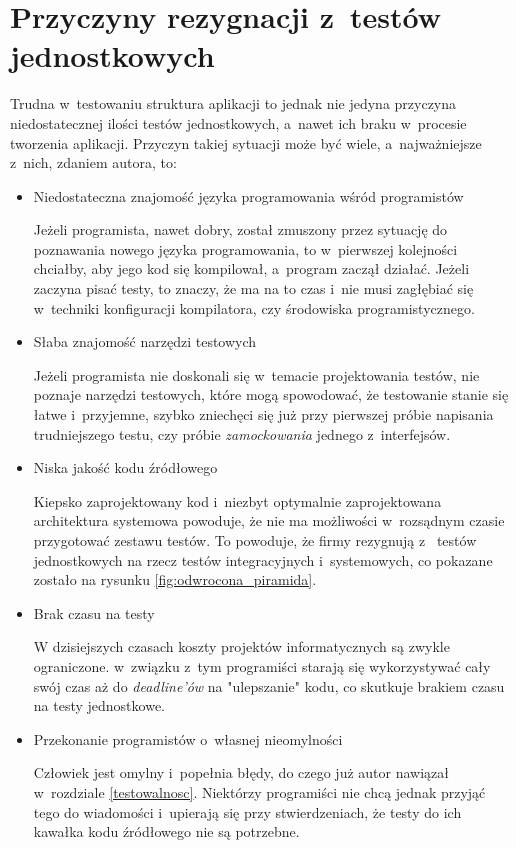 \section{Przyczyny rezygnacji z~testów jednostkowych}
\label{testy_jednostkowe_brak}
Trudna w~testowaniu struktura aplikacji to jednak nie jedyna przyczyna niedostatecznej ilości testów jednostkowych, a~nawet ich braku w~procesie tworzenia aplikacji. Przyczyn takiej sytuacji może być wiele, a~najważniejsze z~nich, zdaniem autora, to:
\begin{itemize}
\item
Niedostateczna znajomość języka programowania wśród programistów

Jeżeli programista, nawet dobry, został zmuszony przez sytuację do poznawania nowego języka programowania, to w~pierwszej kolejności chciałby, aby jego kod się kompilował, a~program zaczął działać. Jeżeli zaczyna pisać testy, to znaczy, że ma na to czas i~nie musi zagłębiać się w~techniki konfiguracji kompilatora, czy środowiska programistycznego. 

\item
Słaba znajomość narzędzi testowych

Jeżeli programista nie doskonali się w~temacie projektowania testów, nie poznaje narzędzi testowych, które mogą spowodować, że testowanie stanie się łatwe i~przyjemne, szybko zniechęci się już przy pierwszej próbie napisania trudniejszego testu, czy próbie \textit{zamockowania} jednego z~interfejsów.

\item
Niska jakość kodu źródłowego

Kiepsko zaprojektowany kod i~niezbyt optymalnie zaprojektowana architektura systemowa powoduje, że nie ma możliwości w~rozsądnym czasie przygotować zestawu testów. To powoduje, że firmy rezygnują z~ testów jednostkowych na rzecz testów integracyjnych i~systemowych, co pokazane zostało na rysunku \ref{fig:odwrocona_piramida}.

\item
Brak czasu na testy

W dzisiejszych czasach koszty projektów informatycznych są zwykle ograniczone. w~związku z~tym programiści starają się wykorzystywać cały swój czas aż do \textit{deadline'ów} na "ulepszanie" kodu, co skutkuje brakiem czasu na testy jednostkowe.

\item
Przekonanie programistów o~własnej nieomylności

Człowiek jest omylny i~popełnia błędy, do czego już autor nawiązał w~rozdziale \ref{testowalnosc}. Niektórzy programiści nie chcą jednak przyjąć tego do wiadomości i~upierają się przy stwierdzeniach, że testy do ich kawałka kodu źródłowego nie są potrzebne.
\end{itemize}

